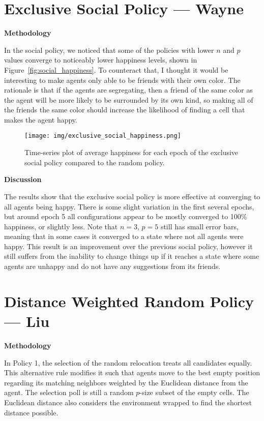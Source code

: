 \documentclass[12pt, titlepage]{article}
\newcommand{\figref}[1]{Figure~\ref{#1}}
\begin{document}
	\section{Exclusive Social Policy --- Wayne}
	\vspace{-12pt}
	\par \textbf{Methodology}
	\par In the social policy, we noticed that some of the policies with lower
	$n$ and $p$ values converge to noticeably lower happiness levels, shown in
	\figref{fig:social_happiness}.
	To counteract that, I thought it would be interesting to make agents only
	able to be friends with their own color.
	The rationale is that if the agents are segregating, then a friend of the
	same color as the agent will be more likely to be surrounded by its own kind,
	so making all of the friends the same color should increase the likelihood of
	finding a cell that makes the agent happy.
	\vspace{-12pt}
	\begin{figure}[htb]
		\centering
		\texttt{[image: img/exclusive\_social\_happiness.png]}
		\vspace{-12pt}
		\caption{Time-series plot of average happiness for each epoch of the
			exclusive social policy compared to the random policy.}%
		\label{fig:excl_social_happiness}
	\end{figure}
	\vspace{-12pt}
	\par \textbf{Discussion}
	\par The results show that the exclusive social policy is more effective at
	converging to all agents being happy.
	There is some slight variation in the first several epochs, but around epoch 5
	all configurations appear to be mostly converged to 100\% happiness, or
	slightly less.
	Note that $n=3$, $p=5$ still has small error bars, meaning that in some cases
	it converged to a state where not all agents were happy.
	This result is an improvement over the previous social policy, however it
	still suffers from the inability to change things up if it reaches a state
	where some agents are unhappy and do not have any suggestions from its
	friends.
	\newpage

	\section{Distance Weighted Random Policy --- Liu}
	\vspace{-12pt}
	\par \textbf{Methodology}
	\par In Policy 1, the selection of the random relocation treats all candidates
	equally.
	This alternative rule modifies it such that agents move to the best empty
	position regarding its matching neighbors weighted by the Euclidean distance
	from the agent.
	The selection poll is still a random $p$-size subset of the empty cells.
	The Euclidean distance also considers the environment wrapped to find the
	shortest distance possible.
\end{document}
